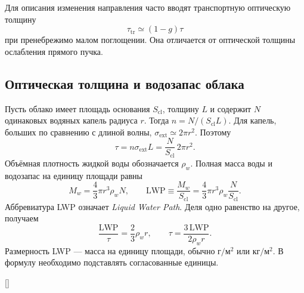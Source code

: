 \documentclass[../final.tex]{subfiles}
\begin{document}
Для описания изменения направления часто вводят транспортную оптическую толщину
\begin{equation*}
 \tau_{\mathrm{tr}}\simeq(1-g)\tau
\end{equation*}
при пренебрежимо малом поглощении. Она отличается от оптической толщины
ослабления прямого пучка.

\clearpage
\subsection{Оптическая толщина и водозапас облака}
Пусть облако имеет площадь основания $S_{\mathrm{cl}}$, толщину $L$
и содержит $N$ одинаковых водяных капель радиуса $r$.
Тогда $n=N/(S_{\mathrm{cl}}L)$.
Для капель, больших по сравнению с длиной волны,
$\sigma_{\mathrm{ext}}\simeq2\pi r^2$. Поэтому
\begin{equation*}
 \tau=n\sigma_{\mathrm{ext}}L
 =\frac{N}{S_{\mathrm{cl}}}\,2\pi r^2.
\end{equation*}
Объёмная плотность жидкой воды обозначается $\rho_w$.
Полная масса воды и водозапас на единицу площади равны
\begin{equation*}
 M_w=\frac43\pi r^3\rho_wN,\qquad
 \mathrm{LWP}\equiv\frac{M_w}{S_{\mathrm{cl}}}
 =\frac43\pi r^3\rho_w\frac{N}{S_{\mathrm{cl}}}.
\end{equation*}
Аббревиатура LWP означает \textit{Liquid Water Path}.
Деля одно равенство на другое, получаем
\begin{equation*}
 \frac{\mathrm{LWP}}{\tau}=\frac23\rho_wr,\qquad
 \boxed{\tau=\frac{3\,\mathrm{LWP}}{2\rho_wr}}.
\end{equation*}
Размерность LWP --- масса на единицу площади, обычно
$\text{г}/\text{м}^2$ или $\text{кг}/\text{м}^2$.
В формулу необходимо подставлять согласованные единицы.

\begin{rbox}[unbreakable,left=14pt,right=14pt,top=12pt,bottom=8pt]{[]}
\centering
\captionsetup{font=footnotesize,hypcap=false,skip=5pt}
\end{rbox}
\end{document}

